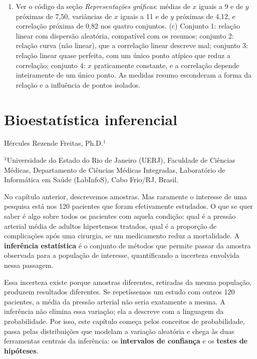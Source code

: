\documentclass[
]{book}
\providecommand{\tightlist}{%
  \setlength{\itemsep}{0pt}\setlength{\parskip}{0pt}}
\begin{document}
\begin{enumerate}
\begin{enumerate}
  \def\labelenumii{(\alph{enumii})}
  \tightlist
  \item
    Ver o código da seção \emph{Representações gráficas}: médias de \(x\) iguais a 9 e de \(y\) próximas de 7,50, variâncias de \(x\) iguais a 11 e de \(y\) próximas de 4,12, e correlação próxima de 0,82 nos quatro conjuntos. (c) Conjunto 1: relação linear com dispersão aleatória, compatível com os resumos; conjunto 2: relação curva (não linear), que a correlação linear descreve mal; conjunto 3: relação linear quase perfeita, com um único ponto atípico que reduz a correlação; conjunto 4: \(x\) praticamente constante, e a correlação depende inteiramente de um único ponto. As medidas resumo esconderam a forma da relação e a influência de pontos isolados.
  \end{enumerate}
\end{enumerate}

\chapter{Bioestatística inferencial}\label{bioestatuxedstica-inferencial}

Hércules Rezende Freitas, Ph.D.\(^1\)

\(^1\)Universidade do Estado do Rio de Janeiro (UERJ), Faculdade de Ciências Médicas, Departamento de Ciências Médicas Integradas, Laboratório de Informática em Saúde (LabInfoS), Cabo Frio/RJ, Brasil.

No capítulo anterior, descrevemos amostras. Mas raramente o interesse de uma pesquisa está nos 120 pacientes que foram efetivamente estudados. O que se quer saber é algo sobre todos os pacientes com aquela condição: qual é a pressão arterial média de adultos hipertensos tratados, qual é a proporção de complicações após uma cirurgia, se um medicamento reduz a mortalidade. A \textbf{inferência estatística} é o conjunto de métodos que permite passar da amostra observada para a população de interesse, quantificando a incerteza envolvida nessa passagem.

Essa incerteza existe porque amostras diferentes, retiradas da mesma população, produzem resultados diferentes. Se repetíssemos um estudo com outros 120 pacientes, a média da pressão arterial não seria exatamente a mesma. A inferência não elimina essa variação; ela a descreve com a linguagem da probabilidade. Por isso, este capítulo começa pelos conceitos de probabilidade, passa pelas distribuições que modelam a variação aleatória e chega às duas ferramentas centrais da inferência: os \textbf{intervalos de confiança} e os \textbf{testes de hipóteses}.
\end{document}
